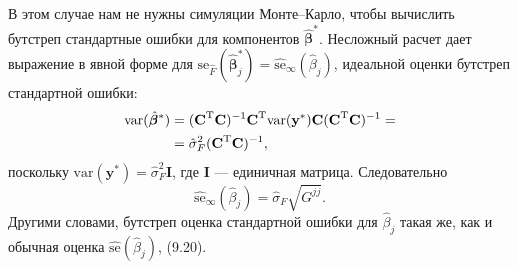 В этом случае нам не нужны симуляции Монте--Карло, чтобы вычислить бутстреп стандартные ошибки для компонентов $\hat{\bm{\beta}}^*$. Несложный расчет дает выражение в явной форме для $\text{se}_{\hat{F}} (\hat{\bm{\beta}}_j^*) = \widehat{\text{se}}_{\infty} (\hat{\beta}_j)$, идеальной оценки бутстреп стандартной ошибки:
\begin{align}
	\text{var}(\hat{\bm{\beta}}^*) & = (\textbf{C}^\text{T} \textbf{C})^{-1} \textbf{C}^\text{T} \text{var}(\textbf{y}^*) \textbf{C}(\textbf{C}^\text{T} \textbf{C})^{-1} = \notag \\
	& = \hat{\sigma}_F^2 (\textbf{C}^\text{T} \textbf{C})^{-1},
\end{align}
поскольку $\text{var}(\textbf{y}^*) = \hat{\sigma}^2_F \textbf{I}$, где $\textbf{I}$ --- единичная матрица. Следовательно
\begin{equation}
	\widehat{\text{se}}_{\infty}(\hat{\beta}_j) = \hat{\sigma}_F \sqrt{G^{jj}}.
\end{equation}
Другими словами, бутстреп оценка стандартной ошибки для $\hat{\beta}_j$ такая же, как и обычная оценка $\widehat{\text{se}}(\hat{\beta}_j)$, (9.20).